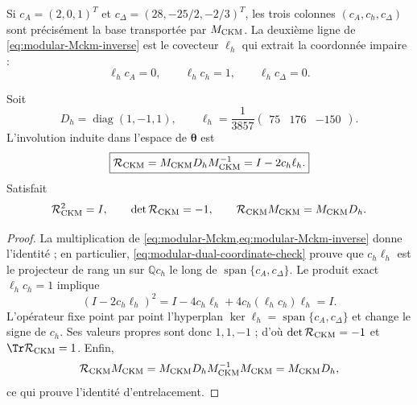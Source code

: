 Si \(c_A=(2,0,1)^T\) et
\(c_\Delta=(28,-25/2,-2/3)^T\), les trois colonnes
\((c_A,c_h,c_\Delta)\) sont précisément la base transportée par
\(M_{\rm CKM}\). La deuxième ligne de
\cref{eq:modular-Mckm-inverse} est le covecteur \(\ell_h\) qui extrait la
coordonnée impaire :
\begin{equation}
\label{eq:modular-dual-coordinate-check}
\ell_hc_A=0,
\qquad
\ell_hc_h=1,
\qquad
\ell_hc_\Delta=0.
\end{equation}

\begin{theorem}
\label{thm:modular-ckm-reflection}
Soit
\begin{equation}
\label{eq:modular-Dh-lh}
D_h=\operatorname{diag}(1,-1,1),
\qquad
\ell_h=\frac1{3857}\begin{pmatrix}75&176&-150\end{pmatrix}.
\end{equation}
L'involution induite dans l'espace de \(\boldsymbol\theta\) est
\begin{equation}
\label{eq:modular-Rckm}
\boxed{
\mathcal R_{\rm CKM}
=M_{\rm CKM}D_hM_{\rm CKM}^{-1}
=I-2c_h\ell_h.}
\end{equation}
Satisfait
\begin{equation}
\label{eq:modular-Rckm-properties}
\mathcal R_{\rm CKM}^2=I,
\qquad
\det\mathcal R_{\rm CKM}=-1,
\qquad
\mathcal R_{\rm CKM}M_{\rm CKM}=M_{\rm CKM}D_h.
\end{equation}
\end{theorem}

\begin{proof}
La multiplication de
\cref{eq:modular-Mckm,eq:modular-Mckm-inverse} donne l'identité ; en
particulier, \cref{eq:modular-dual-coordinate-check} prouve que
\(c_h\ell_h\) est le projecteur de rang un sur \(\mathbb Qc_h\) le
long de \(\operatorname{span}\{c_A,c_\Delta\}\). Le produit exact
\(\ell_hc_h=1\) implique
\[
(I-2c_h\ell_h)^2
=I-4c_h\ell_h+4c_h(\ell_hc_h)\ell_h=I.
\]
L'opérateur fixe point par point l'hyperplan
\(\ker\ell_h=\operatorname{span}\{c_A,c_\Delta\}\) et change le signe de
\(c_h\). Ses valeurs propres sont donc \(1,1,-1\) ; d'où
\(\det\mathcal R_{\rm CKM}=-1\) et
\(\Tr\mathcal R_{\rm CKM}=1\). Enfin,
\[
\mathcal R_{\rm CKM}M_{\rm CKM}
=M_{\rm CKM}D_hM_{\rm CKM}^{-1}M_{\rm CKM}
=M_{\rm CKM}D_h,
\]
ce qui prouve l'identité d'entrelacement.
\end{proof}

